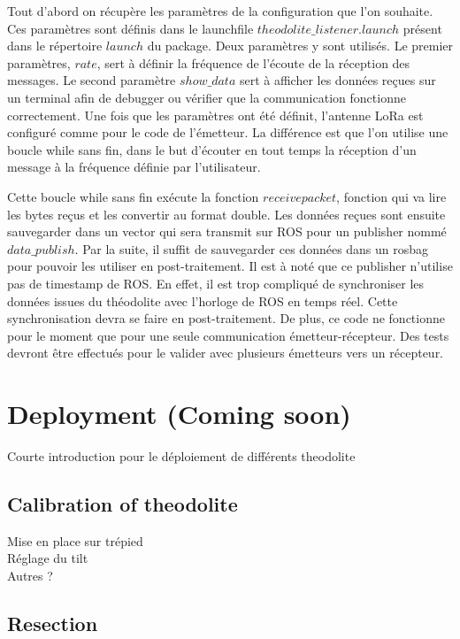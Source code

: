 \documentclass[10pt,letterpaper,oneside]{article}
\begin{document}
Tout d'abord on récupère les paramètres de la configuration que l'on souhaite.
Ces paramètres sont définis dans le launchfile $theodolite\_listener.launch$ présent dans le répertoire $launch$ du package.
Deux paramètres y sont utilisés.
Le premier paramètres, $rate$, sert à définir la fréquence de l'écoute de la réception des messages.
Le second paramètre $show\_data$ sert à afficher les données reçues sur un terminal afin de debugger ou vérifier que la communication fonctionne correctement.
Une fois que les paramètres ont été définit, l'antenne LoRa est configuré comme pour le code de l'émetteur.
La différence est que l'on utilise une boucle while sans fin, dans le but d'écouter en tout temps la réception d'un message à la fréquence définie par l'utilisateur.

Cette boucle while sans fin exécute la fonction $receivepacket$, fonction qui va lire les bytes reçus et les convertir au format double.
Les données reçues sont ensuite sauvegarder dans un vector qui sera transmit sur ROS pour un publisher nommé $data\_publish$.
Par la suite, il suffit de sauvegarder ces données dans un rosbag pour pouvoir les utiliser en post-traitement.
Il est à noté que ce publisher n'utilise pas de timestamp de ROS.
En effet, il est trop compliqué de synchroniser les données issues du théodolite avec l'horloge de ROS en temps réel.
Cette synchronisation devra se faire en post-traitement.
De plus, ce code ne fonctionne pour le moment que pour une seule communication émetteur-récepteur.
Des tests devront être effectués pour le valider avec plusieurs émetteurs vers un récepteur.

\section{Deployment (Coming soon)}
\label{Deployment}

Courte introduction pour le déploiement de différents theodolite

\subsection{Calibration of theodolite}

Mise en place sur trépied \\
Réglage du tilt \\
Autres ? \\

\subsection{Resection}
\end{document}
